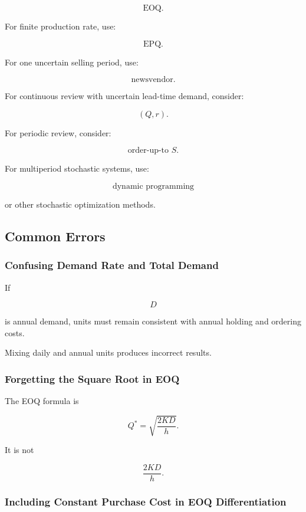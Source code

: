 \[
\boxed{
\text{EOQ}.
}
\]

For finite production rate, use:

\[
\boxed{
\text{EPQ}.
}
\]

For one uncertain selling period, use:

\[
\boxed{
\text{newsvendor}.
}
\]

For continuous review with uncertain lead-time demand, consider:

\[
\boxed{
(Q,r).
}
\]

For periodic review, consider:

\[
\boxed{
\text{order-up-to }S.
}
\]

For multiperiod stochastic systems, use:

\[
\boxed{
\text{dynamic programming}
}
\]

or other stochastic optimization methods.

\subsection{Common Errors}
\label{subsec:inventory-common-errors}

\subsubsection{Confusing Demand Rate and Total Demand}

If

\[
D
\]

is annual demand, units must remain consistent with annual holding and
ordering costs.

Mixing daily and annual units produces incorrect results.

\subsubsection{Forgetting the Square Root in EOQ}

The EOQ formula is

\[
\boxed{
Q^*
=
\sqrt{
\frac{2KD}{h}
}.
}
\]

It is not

\[
\frac{2KD}{h}.
\]

\subsubsection{Including Constant Purchase Cost in EOQ Differentiation}

